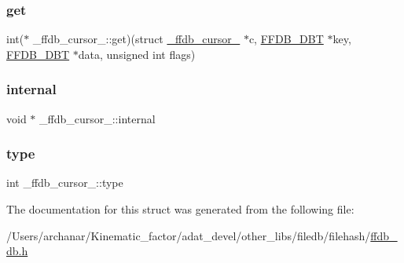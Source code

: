 \mbox{\label{struct__ffdb__cursor___a775458eba1f9b1d69b9b394faaf31ae2}} 
\subsubsection{\texorpdfstring{get}{get}}
{\footnotesize\ttfamily int($\ast$ \+\_\+ffdb\+\_\+cursor\+\_\+\+::get)(struct \mbox{\hyperlink{struct__ffdb__cursor__}{\+\_\+ffdb\+\_\+cursor\+\_\+}} $\ast$c, \mbox{\hyperlink{other__libs_2filedb_2filehash_2ffdb__db_8h_aa2e0984399491df0fdd20898ca8758f9}{F\+F\+D\+B\+\_\+\+D\+BT}} $\ast$key, \mbox{\hyperlink{other__libs_2filedb_2filehash_2ffdb__db_8h_aa2e0984399491df0fdd20898ca8758f9}{F\+F\+D\+B\+\_\+\+D\+BT}} $\ast$data, unsigned int flags)}

\mbox{\label{struct__ffdb__cursor___a1c07d3b46c0463000411b3a8819f928e}} 
\subsubsection{\texorpdfstring{internal}{internal}}
{\footnotesize\ttfamily void $\ast$ \+\_\+ffdb\+\_\+cursor\+\_\+\+::internal}

\mbox{\label{struct__ffdb__cursor___a19f215e12f2d09687f089c87c7b00f29}} 
\subsubsection{\texorpdfstring{type}{type}}
{\footnotesize\ttfamily int \+\_\+ffdb\+\_\+cursor\+\_\+\+::type}



The documentation for this struct was generated from the following file\+:\begin{DoxyCompactItemize}
\item 
/\+Users/archanar/\+Kinematic\+\_\+factor/adat\+\_\+devel/other\+\_\+libs/filedb/filehash/\mbox{\hyperlink{other__libs_2filedb_2filehash_2ffdb__db_8h}{ffdb\+\_\+db.\+h}}\end{DoxyCompactItemize}
